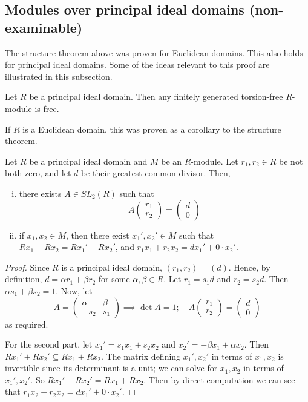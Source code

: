 \subsection{Modules over principal ideal domains (non-examinable)}
The structure theorem above was proven for Euclidean domains.
This also holds for principal ideal domains.
Some of the ideas relevant to this proof are illustrated in this subsection.
\begin{theorem}
	Let \( R \) be a principal ideal domain.
	Then any finitely generated torsion-free \( R \)-module is free.
\end{theorem}
If \( R \) is a Euclidean domain, this was proven as a corollary to the structure theorem.
\begin{lemma}
	Let \( R \) be a principal ideal domain and \( M \) be an \( R \)-module.
	Let \( r_1, r_2 \in R \) be not both zero, and let \( d \) be their greatest common divisor.
	Then,
	\begin{enumerate}[(i)]
		\item there exists \( A \in SL_2(R) \) such that
			\[ A \begin{pmatrix}
				r_1 \\
				r_2
			\end{pmatrix} = \begin{pmatrix}
				d \\
				0
			\end{pmatrix} \]
		\item if \( x_1, x_2 \in M \), then there exist \( x_1', x_2' \in M \) such that \( Rx_1 + Rx_2 = Rx_1' + Rx_2' \), and \( r_1 x_1 + r_2 x_2  = d x_1' + 0 \cdot x_2' \).
	\end{enumerate}
\end{lemma}
\begin{proof}
	Since \( R \) is a principal ideal domain, \( (r_1, r_2) = (d) \).
	Hence, by definition, \( d = \alpha r_1 + \beta r_2 \) for some \( \alpha, \beta \in R \).
	Let \( r_1 = s_1 d \) and \( r_2 = s_2 d \).
	Then \( \alpha s_1 + \beta s_2 = 1 \).
	Now, let
	\[ A = \begin{pmatrix}
		\alpha & \beta \\
		-s_2 & s_1
	\end{pmatrix} \implies \det A = 1;\quad A \begin{pmatrix}
		r_1 \\
		r_2
	\end{pmatrix} = \begin{pmatrix}
		d \\
		0
	\end{pmatrix} \]
	as required.

	For the second part, let \( x_1' = s_1 x_1 + s_2 x_2 \) and \( x_2' = -\beta x_1 + \alpha x_2 \).
	Then \( Rx_1' + Rx_2' \subseteq Rx_1 + Rx_2 \).
	The matrix defining \( x_1', x_2' \) in terms of \( x_1, x_2 \) is invertible since its determinant is a unit; we can solve for \( x_1, x_2 \) in terms of \( x_1', x_2' \).
	So \( Rx_1' + Rx_2' = Rx_1 + Rx_2 \).
	Then by direct computation we can see that \( r_1 x_2 + r_2 x_2 = d x_1' + 0 \cdot x_2' \).
\end{proof}

